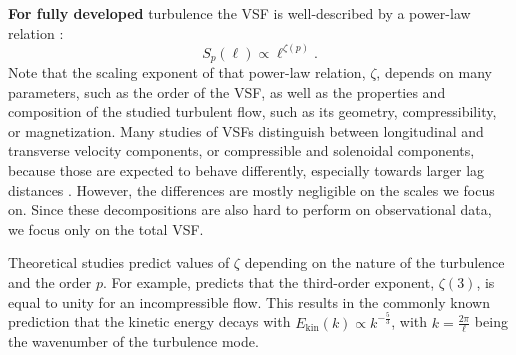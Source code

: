 \textbf{For fully developed} turbulence 
the VSF is 
well-described by a power-law relation \citep{Kolmogorov1941,She1994,Boldyrev2002}:
\begin{equation}
	\mathit{S}_p (\ell) \propto \ell^{\zeta(p)} .
    \label{equ:method:propto_zeta}
\end{equation}
Note that the scaling exponent of that power-law relation, $\zeta$, depends on many parameters, such as the order of the VSF, as well as the properties and composition of the studied turbulent flow, such as its geometry, compressibility, or 
      magnetization.
Many studies of VSFs distinguish between longitudinal and transverse velocity components, or compressible and solenoidal components, because those are expected to behave differently, especially towards larger lag distances \citep{Gotoh2002,Schmidt2008,Benzi2010}.
However, the differences are mostly negligible on the scales we focus on. 
    Since these decompositions are also hard to perform on observational data, we focus only on the total VSF.

Theoretical studies predict values of $\zeta$ depending on the nature of the turbulence and the order $p$.
For example, \citet{Kolmogorov1941} predicts that the third-order exponent, $\zeta(3)$, is equal to unity for an incompressible
flow.
This results in the commonly known prediction that the kinetic energy decays with $E_{\mathrm{kin}}(k) \propto k^{-\frac{5}{3}}$, with $k = \frac{2 \pi}{\ell}$ being the wavenumber of the turbulence mode.

